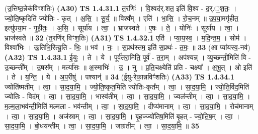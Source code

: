 \documentclass[17pt]{extarticle}
\begin{document}
                  \newline
                      (उ॒त्तिष्ठ॒न्नेक॑विꣳशतिः)  \textbf{(A30)} \newline \newline
                                \textbf{ TS 1.4.31.1} \newline
                  त॒रणिः॑ । वि॒श्वद॑र्.शत॒ इति॑ वि॒श्व - द॒र्.॒श॒तः॒ । ज्यो॒ति॒ष्कृदिति॑ ज्योतिः - कृत् । अ॒सि॒ । सू॒र्य॒ ॥ विश्व᳚म् । एति॑ । भा॒सि॒ । रो॒च॒नम् ॥ उ॒प॒या॒मगृ॑हीत॒ इत्यु॑पया॒म - गृ॒ही॒तः॒ । अ॒सि॒ । सूर्या॑य । त्वा॒ । भ्राज॑स्वते । ए॒षः । ते॒ । योनिः॑ । सूर्या॑य । त्वा॒ । भ्राज॑स्वते ॥ \textbf{  32 } \newline
                  \newline
                      (त॒रणि॑र् विꣳश॒तिः)  \textbf{(A31)} \newline \newline
                                \textbf{ TS 1.4.32.1} \newline
                  एति॑ । प्या॒य॒स्व॒ । म॒दि॒न्त॒म॒ । सोम॑ । विश्वा॑भिः । ऊ॒तिभि॒रित्यू॒ति - भिः॒ ॥ भव॑ । नः॒ । स॒प्रथ॑स्तम॒ इति॑ स॒प्रथः॑ - त॒मः॒ ॥ \textbf{  33 } \newline
                  \newline
                      (आ प्या॑यस्व॒-नव॑)  \textbf{(A32)} \newline \newline
                                \textbf{ TS 1.4.33.1} \newline
                  ई॒युः । ते । ये । पूर्व॑तरा॒मिति॒ पूर्व॑ - त॒रा॒म् । अप॑श्यन्न् । व्यु॒च्छन्ती॒मिति॑ वि - उ॒च्छन्ती᳚म् । उ॒षस᳚म् । मर्त्या॑सः ॥ अ॒स्माभिः॑ । उ॒ । नु । प्र॒ति॒चक्ष्येति॑ प्रति - चक्ष्या᳚ । अ॒भू॒त् । ओ इति॑ । ते । य॒न्ति॒ । ये । अ॒प॒रीषु॑ । पश्यान्॑ ॥ \textbf{  34 } \newline
                  \newline
                      (ई॒यु-रेका॒न्नविꣳ॑शतिः)  \textbf{(A33)} \newline \newline
                                \textbf{ TS 1.4.34.1} \newline
                  ज्योति॑ष्मतीम् । त्वा॒ । सा॒द॒या॒मि॒ । ज्यो॒ति॒ष्कृत॒मिति॑ ज्योतिः-कृत᳚म् । त्वा॒ । सा॒द॒या॒मि॒ । ज्यो॒ति॒र्विद॒मिति॑ ज्योतिः - विद᳚म् । त्वा॒ । सा॒द॒या॒मि॒ । भास्व॑तीम् । त्वा॒ । सा॒द॒या॒मि॒ । ज्वल॑न्तीम् । त्वा॒ । सा॒द॒या॒मि॒ । म॒ल्म॒ला॒भव॑न्ती॒मिति॑ मल्मला - भव॑न्तीम् । त्वा॒ । सा॒द॒या॒मि॒ । दीप्य॑मानाम् । त्वा॒ । सा॒द॒या॒मि॒ । रोच॑मानाम् । त्वा॒ । सा॒द॒या॒मि॒ । अज॑स्राम् । त्वा॒ । सा॒द॒या॒मि॒ । बृ॒हज्ज्यो॑तिष॒मिति॑ बृ॒हत् - ज्यो॒ति॒ष॒म् । त्वा॒ । सा॒द॒या॒मि॒ । बो॒धय॑न्तीम् । त्वा॒ । सा॒द॒या॒मि॒ । जाग्र॑तीम् । त्वा॒ । सा॒द॒या॒मि॒ ॥ \textbf{  35 } \newline
\end{document}
